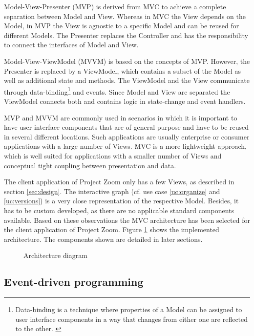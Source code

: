 Model-View-Presenter (MVP) is derived from MVC to achieve a complete separation between Model and View. Whereas in MVC the View depends on the Model, in MVP the View is agnostic to a specific Model and can be reused for different Models. The Presenter replaces the Controller and has the responsibility to connect the interfaces of Model and View. 

Model-View-ViewModel (MVVM) is based on the concepts of MVP. However, the Presenter is replaced by a ViewModel, which contains a subset of the Model as well as additional state and methods. The ViewModel and the View communicate through data-binding\footnote{Data-binding is a technique where properties of a Model can be assigned to user interface components in a way that changes from either one are reflected to the other. \cite{Bent_2004}} and events. Since Model and View are separated the ViewModel connects both and contains logic in state-change and event handlers.

MVP and MVVM are commonly used in scenarios in which it is important to have user interface components that are of general-purpose and have to be reused in several different locations. Such applications are usually enterprise or consumer applications with a large number of Views. MVC is a more lightweight approach, which is well suited for applications with a smaller number of Views and conceptual tight coupling between presentation and data. \cite{Osmani_2012}

The client application of Project Zoom only has a few Views, as described in section \ref{sec:design}. The interactive graph (cf. use case \ref{uc:organize} and \ref{uc:versions}) is a very close representation of the respective Model. Besides, it has to be custom developed, as there are no applicable standard components available. Based on these observations the MVC architecture has been selected for the client application of Project Zoom. Figure \ref{fig:arch} shows the implemented architecture. The components shown are detailed in later sections.

\begin{figure}
\caption{Architecture diagram}
\label{fig:arch}
\end{figure}


\subsection{Event-driven programming}
\label{sec:eventbased}

